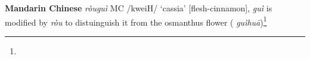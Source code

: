 \begin{etymology}\label{ety:rougui}
\textbf{Mandarin Chinese}  \textit{ròuguì} MC /kweiH/ `cassia' [flesh-cinnamon], \textit{guì} is modified by \textit{ròu} to distuinguish it from the osmanthus flower ( \textit{guìhuā})\footnote{}
\end{etymology}